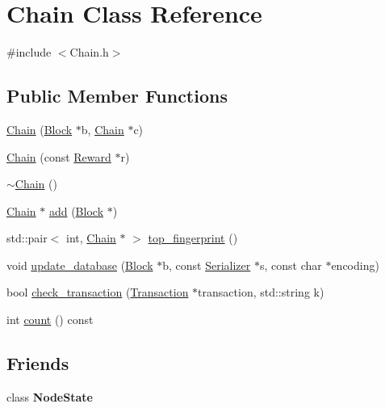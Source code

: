 \hypertarget{classChain}{}\section{Chain Class Reference}
\label{classChain}


{\ttfamily \#include $<$Chain.\+h$>$}

\subsection*{Public Member Functions}
\begin{DoxyCompactItemize}
\item 
\mbox{\hyperlink{classChain_ae70c386f5d7b2e333419296545656907}{Chain}} (\mbox{\hyperlink{classBlock}{Block}} $\ast$b, \mbox{\hyperlink{classChain}{Chain}} $\ast$c)
\item 
\mbox{\hyperlink{classChain_a97217102b89693d94c7c724cfcafa28f}{Chain}} (const \mbox{\hyperlink{classReward}{Reward}} $\ast$r)
\item 
\mbox{\hyperlink{classChain_a06b56afcf5b9ef0c6371b49ae2eef2da}{$\sim$\+Chain}} ()
\item 
\mbox{\hyperlink{classChain}{Chain}} $\ast$ \mbox{\hyperlink{classChain_a7a271a75a12aeae52a2645dcaa14549c}{add}} (\mbox{\hyperlink{classBlock}{Block}} $\ast$)
\item 
std\+::pair$<$ int, \mbox{\hyperlink{classChain}{Chain}} $\ast$ $>$ \mbox{\hyperlink{classChain_a5ee2e1efbfe8d2896b0ac836fb750362}{top\+\_\+fingerprint}} ()
\item 
void \mbox{\hyperlink{classChain_a19dda9a394df1d45b014c649eb77cb64}{update\+\_\+database}} (\mbox{\hyperlink{classBlock}{Block}} $\ast$b, const \mbox{\hyperlink{classSerializer}{Serializer}} $\ast$s, const char $\ast$encoding)
\item 
bool \mbox{\hyperlink{classChain_a5725ffa89b1f0333536238951d9acd91}{check\+\_\+transaction}} (\mbox{\hyperlink{classTransaction}{Transaction}} $\ast$transaction, std\+::string k)
\item 
int \mbox{\hyperlink{classChain_ad06a7e312123831339b614a74ff5c9e0}{count}} () const
\end{DoxyCompactItemize}
\subsection*{Friends}
\begin{DoxyCompactItemize}
\item 
\mbox{\label{classChain_adfdd1242f00ef4da9a9a01d996fc292c}} 
class {\bfseries Node\+State}
\end{DoxyCompactItemize}


